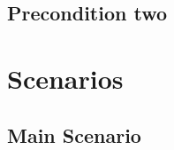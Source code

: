 \documentclass[notitlepage,fullpage]{article}
\begin{document}
\subsection{Precondition two}
\begin{comment}
   \textcolor{blue}{A second precondition.}
\end{comment}

\section{Scenarios}\label{sec:scenarios}

\begin{comment}
\begin{color}{blue}
A use case consists of a number of scenarios, each representing specific instances of the use case that correspond to specific inputs from the actor or to specific conditions in the environment. Each scenario describes alternative ways that the system provides a behavior, or it can describe failure or exception cases., as depicted in figure 1.
\end{color}

\begin{verbatim}

                                                    __(A2.1)__
                         ___(A1)__         __(A2)__/          \___
(main scenario)_________/         \_______/                       \__.
\end{verbatim}

\begin{color}{blue}\noindent Figure 1. Use-case scenarios\end{color}
\end{comment}

\subsection{Main Scenario}\label{subsec:main:scenario}
\end{document}
